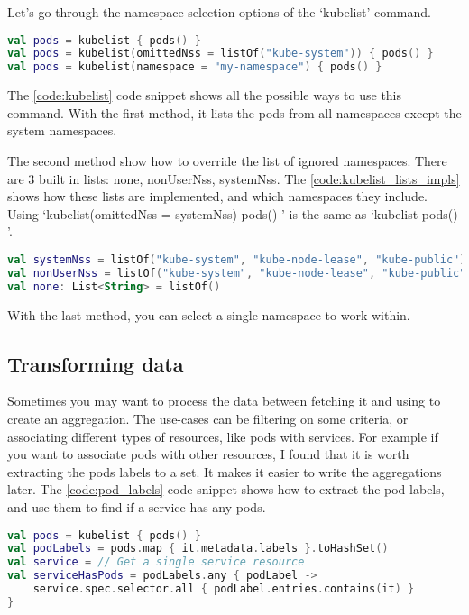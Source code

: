 Let's go through the namespace selection options of the `kubelist' command.

\begin{lstlisting}[caption={Usages of kubelist},language=Kotlin,label=code:kubelist]
val pods = kubelist { pods() }
val pods = kubelist(omittedNss = listOf("kube-system")) { pods() }
val pods = kubelist(namespace = "my-namespace") { pods() }
\end{lstlisting}

The \ref{code:kubelist} code snippet shows all the possible ways to use this command. With the first method, it lists the pods from all namespaces except the system namespaces.

The second method show how to override the list of ignored namespaces. There are 3 built in lists: none, nonUserNss, systemNss. The \ref{code:kubelist_lists_impls} shows how these lists are implemented, and which namespaces they include. Using `kubelist(omittedNss = systemNss) { pods() }' is the same as `kubelist { pods() }'.

\begin{lstlisting}[caption={Usages of kubelist},language=Kotlin,label=code:kubelist_lists_impls]
val systemNss = listOf("kube-system", "kube-node-lease", "kube-public")
val nonUserNss = listOf("kube-system", "kube-node-lease", "kube-public", "default")
val none: List<String> = listOf()
\end{lstlisting}

With the last method, you can select a single namespace to work within.

\subsection{Transforming data}

Sometimes you may want to process the data between fetching it and using to create an aggregation. The use-cases can be filtering on some criteria, or associating different types of resources, like pods with services. For example if you want to associate pods with other resources, I found that it is worth extracting the pods labels to a set. It makes it easier to write the aggregations later. The \ref{code:pod_labels} code snippet shows how to extract the pod labels, and use them to find if a service has any pods.

\begin{lstlisting}[caption={Extraction of pod labels},language=Kotlin,label=code:pod_labels]
val pods = kubelist { pods() }
val podLabels = pods.map { it.metadata.labels }.toHashSet()
val service = // Get a single service resource
val serviceHasPods = podLabels.any { podLabel ->
    service.spec.selector.all { podLabel.entries.contains(it) }
}
\end{lstlisting}

